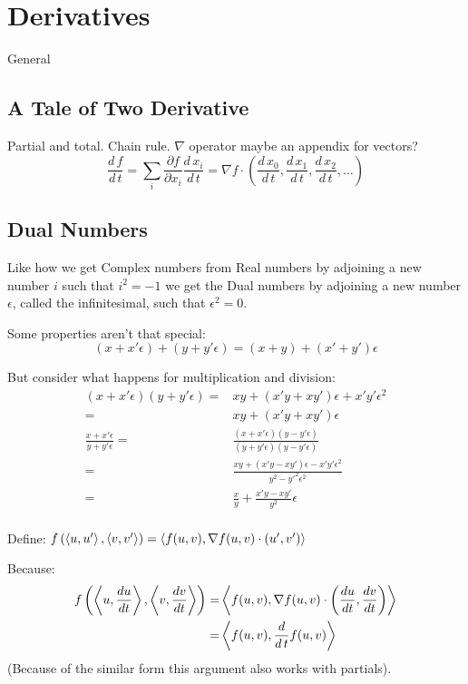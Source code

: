 
\chapter{Derivatives}
General

\section{A Tale of Two Derivative}
Partial and total.
Chain rule.
$\nabla$ operator maybe an appendix for vectors?
\[\frac{d\,f}{d\,t} = \sum_i \frac{\partial f}{\partial x_i}\frac{d\,x_i}{d\,t} = \nabla f \cdot \left(\frac{d\,x_0}{d\,t},\frac{d\,x_1}{d\,t},\frac{d\,x_2}{d\,t},\dots\right)\]

\section{Dual Numbers}
Like how we get Complex numbers from Real numbers by adjoining a new number $i$ such that $i^2=-1$ we get the Dual numbers by adjoining a new number $\epsilon$, 
called the infinitesimal, 
such that $\epsilon^2 = 0$.

Some properties aren't that special:
\[(x+x'\epsilon) + (y+y'\epsilon) = (x+y)+(x'+y')\epsilon\]

But consider what happens for multiplication and division:
\begin{equation*}
\begin{aligned}
(x+x'\epsilon)(y+y'\epsilon) =& xy+(x'y+xy')\epsilon+x'y'\epsilon^2 \\
=& xy+(x'y+xy')\epsilon \\
\frac{x+x'\epsilon}{y+y'\epsilon} =& \frac{(x+x'\epsilon)(y-y'\epsilon)}{(y+y'\epsilon)(y-y'\epsilon)} \\
 =& \frac{xy+(x'y-xy')\epsilon-x'y'\epsilon^2}{y^2-y'^2\epsilon^2} \\
 =& \frac{x}{y}+\frac{x'y-xy'}{y^2}\epsilon \\
\end{aligned}
\end{equation*}

Define:
$f\left(\left\langle u,u' \right\rangle,\left\langle v,v' \right\rangle\right) = \left\langle f(u,v),\nabla f(u,v) \cdot (u',v') \right\rangle$

Because:
\begin{equation*}
\begin{aligned}
	f\left(\left\langle u,\frac{du}{dt} \right\rangle,\left\langle v,\frac{dv}{dt} \right\rangle\right) =& \left\langle f(u,v),\nabla f(u,v) \cdot \left(\frac{du}{dt},\frac{dv}{dt}\right) \right\rangle \\
	=& \left\langle f(u,v),\frac{d}{d\,t}f(u,v) \right\rangle \\
\end{aligned}
\end{equation*}
(Because of the similar form this argument also works with partials).

